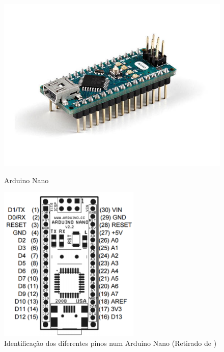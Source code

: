 \begin{figure}[h]
	\centering
	\begin{minipage}[b]{0.49\textwidth}
		\centering
		\includegraphics[width=\textwidth]{img/hardware/nano-img.jpg}
		\caption{Arduino Nano}
		\label{ard2}
	\end{minipage}
	\hfill
	\begin{minipage}[b]{0.49\textwidth}
		\centering
		\includegraphics[width=0.6\textwidth]{img/hardware/nano-esquema.png}
		\caption[Identificação dos diferentes pinos num Arduino Nano]{Identificação dos diferentes pinos num Arduino Nano (Retirado de \cite{arduinonanouser})}
		\label{ard1}
	\end{minipage}
\end{figure}





